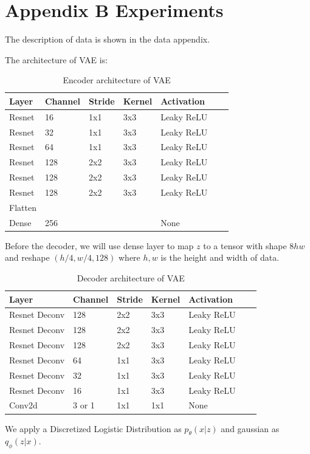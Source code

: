 \documentclass[a3paper]{article}
\begin{document}
\section{Appendix B Experiments}

The description of data is shown in the data appendix. 

The architecture of VAE is: 

\begin{table}[H]
\centering
\begin{tabular}{lllllll}
Layer     & Channel & Stride & Kernel & Activation  \\
\toprule
Resnet & 16 & 1x1 & 3x3 & Leaky ReLU \\
Resnet & 32 & 1x1 & 3x3 & Leaky ReLU \\
Resnet & 64 & 1x1 & 3x3 & Leaky ReLU \\
Resnet & 128 & 2x2 & 3x3 & Leaky ReLU \\
Resnet & 128 & 2x2 & 3x3 & Leaky ReLU \\
Resnet & 128 & 2x2 & 3x3 & Leaky ReLU \\
Flatten & \\
Dense & 256 &  &  & None \\
\bottomrule
\end{tabular}
\caption{Encoder architecture of VAE}
\end{table}

Before the decoder, we will use dense layer to map $z$ to a tensor with shape $8hw$ and reshape $(h / 4, w / 4, 128)$ where $h, w$ is the height and width of data. 

\begin{table}[H]
\centering
\begin{tabular}{lllllll}
Layer     & Channel & Stride & Kernel & Activation  \\
\toprule
Resnet Deconv & 128 & 2x2 & 3x3 & Leaky ReLU \\
Resnet Deconv & 128 & 2x2 & 3x3 & Leaky ReLU \\
Resnet Deconv & 128 & 2x2 & 3x3 & Leaky ReLU \\
Resnet Deconv & 64 & 1x1 & 3x3 & Leaky ReLU \\
Resnet Deconv & 32 & 1x1 & 3x3 & Leaky ReLU \\
Resnet Deconv & 16 & 1x1 & 3x3 & Leaky ReLU \\
Conv2d & 3 or 1 & 1x1 & 1x1 & None \\
\bottomrule
\end{tabular}
\caption{Decoder architecture of VAE}
\end{table}
We apply a Discretized Logistic Distribution as $p_\theta(x|z)$ and gaussian as $q_\phi(z|x)$. 
\end{document}
